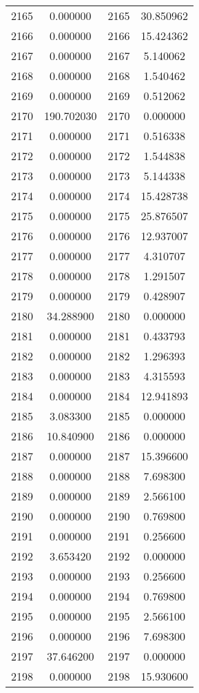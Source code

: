 \documentclass[12pt]{article}
\begin{document}
\begin{longtable}{@{}cccc@{}}
2165 & 0.000000 & 2165 & 30.850962 \\
2166 & 0.000000 & 2166 & 15.424362 \\
2167 & 0.000000 & 2167 & 5.140062 \\
2168 & 0.000000 & 2168 & 1.540462 \\
2169 & 0.000000 & 2169 & 0.512062 \\
2170 & 190.702030 & 2170 & 0.000000 \\
2171 & 0.000000 & 2171 & 0.516338 \\
2172 & 0.000000 & 2172 & 1.544838 \\
2173 & 0.000000 & 2173 & 5.144338 \\
2174 & 0.000000 & 2174 & 15.428738 \\
2175 & 0.000000 & 2175 & 25.876507 \\
2176 & 0.000000 & 2176 & 12.937007 \\
2177 & 0.000000 & 2177 & 4.310707 \\
2178 & 0.000000 & 2178 & 1.291507 \\
2179 & 0.000000 & 2179 & 0.428907 \\
2180 & 34.288900 & 2180 & 0.000000 \\
2181 & 0.000000 & 2181 & 0.433793 \\
2182 & 0.000000 & 2182 & 1.296393 \\
2183 & 0.000000 & 2183 & 4.315593 \\
2184 & 0.000000 & 2184 & 12.941893 \\
2185 & 3.083300 & 2185 & 0.000000 \\
2186 & 10.840900 & 2186 & 0.000000 \\
2187 & 0.000000 & 2187 & 15.396600 \\
2188 & 0.000000 & 2188 & 7.698300 \\
2189 & 0.000000 & 2189 & 2.566100 \\
2190 & 0.000000 & 2190 & 0.769800 \\
2191 & 0.000000 & 2191 & 0.256600 \\
2192 & 3.653420 & 2192 & 0.000000 \\
2193 & 0.000000 & 2193 & 0.256600 \\
2194 & 0.000000 & 2194 & 0.769800 \\
2195 & 0.000000 & 2195 & 2.566100 \\
2196 & 0.000000 & 2196 & 7.698300 \\
2197 & 37.646200 & 2197 & 0.000000 \\
2198 & 0.000000 & 2198 & 15.930600 \\

\end{longtable}
\end{document}
